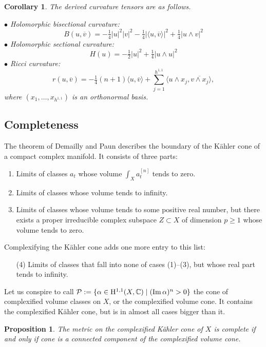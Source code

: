 \documentclass[11pt,a4paper]{amsart}
\newtheorem{prop}[theo]{Proposition}
\newtheorem{coro}[theo]{Corollary}
\theoremstyle{definition}
\theoremstyle{remark}
\newcommand{\CC}{\mathbb{C}}
\def\Im{\mathop{\rm Im}}
\def\ov#1{\overline{#1}}
\def\coho#1{\mathrm{H}^{#1}}
\def\met#1#2{\langle #1, \ov{#2} \rangle}
\def\ton{u}
\def\ttw{v}
\def\^#1{^{[#1]}}
\begin{document}
\begin{coro}
The derived curvature tensors are as follows.

\smallskip
\noindent
$\bullet$
Holomorphic bisectional curvature:
$$
B(\ton,\ov\ttw) 
= -\tfrac14 |\ton|^2 |\ttw|^2
- \tfrac14 |\met{\ton}{\ttw}|^2
+ \tfrac14 |\ton \wedge \ttw|^2
$$
\smallskip
\noindent
$\bullet$
Holomorphic sectional curvature:
$$
H(\ton) 
=
-\tfrac12 |\ton|^2
+\tfrac14 |\ton \wedge \ton|^2
$$
\smallskip
\noindent
$\bullet$
Ricci curvature:
$$
r(\ton, \ov\ttw) 
=
-\tfrac14(n+1) \met{\ton}{\ttw}
+ \sum_{j=1}^{h^{1,1}} \met{\ton\wedge x_j}{\ttw \wedge x_j},
$$
where $(x_1,\ldots,x_{h^{1,1}})$ is an orthonormal basis.
\end{coro}




\subsection*{Completeness}

The theorem of Demailly and Paun describes the boundary of the
K\"{a}hler cone of a compact complex manifold. It consists of three
parts:
\begin{enumerate}
\item Limits of classes $a_t$ whose volume $\int_X a_t\^n$
tends to zero.
\item Limits of classes whose volume tends to infinity.
\item Limits of classes whose volume tends to some positive real
number, but there exists a proper irreducible complex subspace $Z
\subset X$ of dimension $p \geq 1$ whose volume tends to zero.
\end{enumerate}
Complexifying the K\"{a}hler cone adds one more entry to this list:
\begin{enumerate}
\item[(4)] Limits of classes that fall into none of cases (1)--(3), but
whose real part tends to infinity.
\end{enumerate}

Let us conspire to call $\mathcal{P} := \{\alpha \in \coho{1,1}(X,\CC)
\mid (\Im\alpha)^n > 0\}$ the cone of complexified volume classes on
$X$, or the complexified volume cone. It contains the complexified
K\"{a}hler cone, but is in almost all cases bigger than it.

\begin{prop}
\label{prop:fofo}
The metric on the complexified K\"{a}hler cone of $X$ is complete if and
only if cone is a connected component of the complexified volume cone.
\end{prop}
\end{document}
